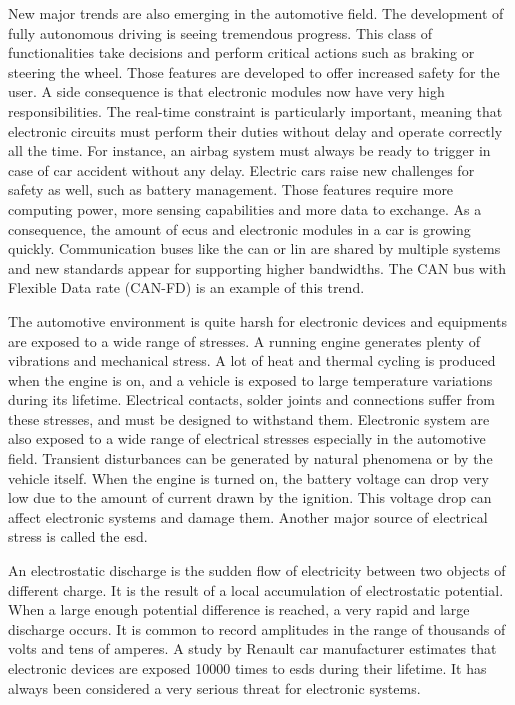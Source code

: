 New major trends are also emerging in the automotive field.
The development of fully autonomous driving is seeing tremendous progress.
This class of functionalities take decisions and perform critical actions such as braking or steering the wheel.
Those features are developed to offer increased safety for the user.
A side consequence is that electronic modules now have very high responsibilities.
The real-time constraint is particularly important, meaning that electronic circuits must perform their duties without delay and operate correctly all the time.
For instance, an airbag system must always be ready to trigger in case of car accident without any delay.
Electric cars raise new challenges for safety as well, such as battery management.
Those features require more computing power, more sensing capabilities and more data to exchange.
As a consequence, the amount of \gls{ecu}s and electronic modules in a car is growing quickly.
Communication buses like the \gls{can} \cite{CAN} or \gls{lin} \cite{LIN} are shared by multiple systems and new standards appear for supporting higher bandwidths.
The CAN bus with Flexible Data rate (CAN-FD) is an example of this trend.

The automotive environment is quite harsh for electronic devices and equipments are exposed to a wide range of stresses.
A running engine generates plenty of vibrations and mechanical stress.
A lot of heat and thermal cycling is produced when the engine is on, and a vehicle is exposed to large temperature variations during its lifetime.
Electrical contacts, solder joints and connections suffer from these stresses, and must be designed to withstand them.
Electronic system are also exposed to a wide range of electrical stresses especially in the automotive field.
Transient disturbances can be generated by natural phenomena or by the vehicle itself.
When the engine is turned on, the battery voltage can drop very low due to the amount of current drawn by the ignition.
This voltage drop can affect electronic systems and damage them.
Another major source of electrical stress is called the \gls{esd}.

An electrostatic discharge is the sudden flow of electricity between two objects of different charge.
It is the result of a local accumulation of electrostatic potential.
When a large enough potential difference is reached, a very rapid and large discharge occurs.
It is common to record amplitudes in the range of thousands of volts and tens of amperes.
A study by Renault car manufacturer \cite{Renault-esd} estimates that electronic devices are exposed 10000 times to \gls{esd}s during their lifetime.
It has always been considered a very serious threat for electronic systems.


